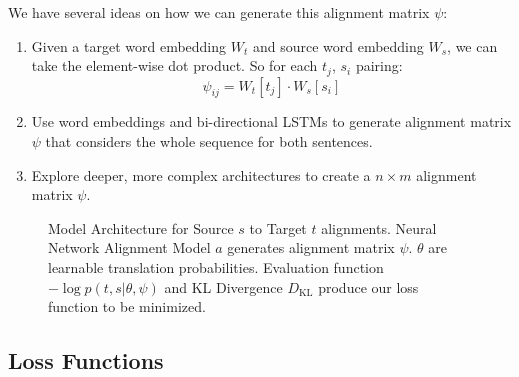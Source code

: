 \documentclass[twoside,twocolumn]{article}
\begin{document}
We have several ideas on how we can generate this alignment matrix $\psi$:
\begin{enumerate}
  \item Given a target word embedding $W_t$ and source word embedding $W_s$, we
    can take the element-wise dot product. So for each $t_j$, $s_i$ pairing:
  \begin{equation}
    \psi_{ij} = W_t[t_j] \cdot W_s[s_i]
  \end{equation}
  \item Use word embeddings and bi-directional LSTMs to generate alignment
    matrix $\psi$ that considers the whole sequence for both sentences.
  \item Explore deeper, more complex architectures to create a $n \times m$
    alignment matrix $\psi$.
\end{enumerate}

\begin{figure}
\centering
{}
\caption{Model Architecture for Source $s$ to Target $t$ alignments. Neural
Network Alignment Model $a$ generates alignment matrix $\psi$. $\theta$ are
learnable translation probabilities. Evaluation function
$- \log p(t, s | \theta, \psi)$ and KL Divergence $D_{\mathrm{KL}}$ produce our
loss function to be minimized.}
\end{figure}


\subsection{Loss Functions}
\end{document}
